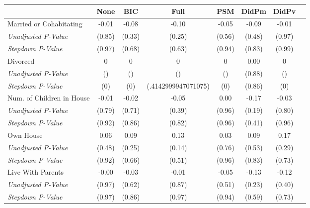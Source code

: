 \begin{tabular}{l c c c c c c c}
\toprule
 & None & BIC & Full & PSM & DidPm & DidPv \\
\midrule
Married or Cohabitating & -0.01 & -0.08 & -0.10 & -0.05 & -0.09 & -0.01 \\
\quad \textit{Unadjusted P-Value} & (0.85) & (0.33) & (0.25) & (0.56) & (0.48) & (0.97) \\
\quad \textit{Stepdown P-Value} & (0.97) & (0.68) & (0.63) & (0.94) & (0.83) & (0.99) \\
Divorced & 0 & 0 & 0 & 0 & 0.00 & 0 \\
\quad \textit{Unadjusted P-Value} & () & () & () & () & (0.88) & () \\
\quad \textit{Stepdown P-Value} & (0) & (0) & (.4142999947071075) & (0) & (0.86) & (0) \\
Num. of Children in House & -0.01 & -0.02 & -0.05 & 0.00 & -0.17 & -0.03 \\
\quad \textit{Unadjusted P-Value} & (0.79) & (0.71) & (0.39) & (0.96) & (0.19) & (0.80) \\
\quad \textit{Stepdown P-Value} & (0.92) & (0.86) & (0.82) & (0.96) & (0.41) & (0.96) \\
Own House & 0.06 & 0.09 & 0.13 & 0.03 & 0.09 & 0.17 \\
\quad \textit{Unadjusted P-Value} & (0.48) & (0.25) & (0.14) & (0.76) & (0.53) & (0.29) \\
\quad \textit{Stepdown P-Value} & (0.92) & (0.66) & (0.51) & (0.96) & (0.83) & (0.73) \\
Live With Parents & -0.00 & -0.03 & -0.01 & -0.05 & -0.13 & -0.12 \\
\quad \textit{Unadjusted P-Value} & (0.97) & (0.62) & (0.87) & (0.51) & (0.23) & (0.40) \\
\quad \textit{Stepdown P-Value} & (0.97) & (0.86) & (0.97) & (0.94) & (0.59) & (0.73) \\
\bottomrule
\end{tabular}
